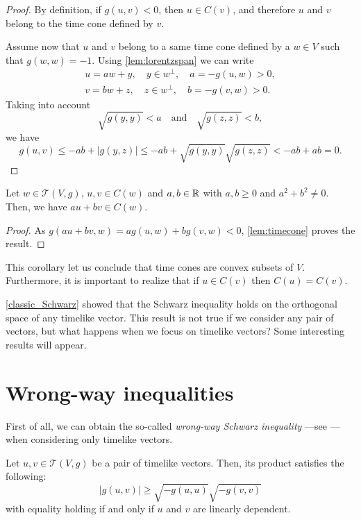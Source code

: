 \begin{proof}
    By definition, if $g(u,v)<0$, then $u\in C(v)$, and therefore $u$ and $v$ belong to the time cone defined by $v$.
    
    Assume now that $u$ and $v$ belong to a same time cone defined by a $w \in V$ such that $g(w,w) = -1$. Using \autoref{lem:lorentzspan} we can write
    \begin{align*}
        u=aw+y, \quad y\in w^{\perp}, \quad a=-g(u,w)>0,\\
        v=bw+z, \quad z\in w^{\perp}, \quad b=-g(v,w)>0.
    \end{align*}
    Taking into account
    \[
	    \sqrt{g(y,y)}<a \quad \mathrm{and} \quad \sqrt{g(z,z)}<b,
    \]
    we have
    \[
	    g(u,v)\leq -ab+ \lvert g(y,z) \rvert \leq -ab + \sqrt{g(y,y)}\sqrt{g(z,z)}<-ab+ab=0.
    \]
\end{proof}

\begin{corollary}\label{convexity}
Let $w\in\mathcal{T}(V,g)$, $u,v\in C(w)$ and $a,b\in \mathbb{R}$ with $a,b\geq 0$ and $a^2+b^2 \neq 0$. Then, we have $au+bv\in C(w)$.
\end{corollary}

\begin{proof}
    As $g(au+bv,w)=a g(u,w)+ b g(v,w)<0$, \autoref{lem:timecone} proves the result.
\end{proof}

This corollary let us conclude that time cones are convex subsets of $V$. Furthermore, it is important to realize that if $u\in C(v)$ then $C(u)=C(v)$.

\autoref{classic_Schwarz} showed that the Schwarz inequality holds on the orthogonal space of any timelike vector. This result is not true if we consider any pair of vectors, but what happens when we focus on timelike vectors? Some interesting results will appear.

\section{Wrong-way inequalities}

First of all, we can obtain the so-called \emph{wrong-way Schwarz inequality} ---see \cite[Prop. 5.30]{oneill83}--- when considering only timelike vectors.

\begin{proposition}
	\label{pro:wrongway}
    Let $u,v \in \mathcal{T}(V,g)$ be a pair of timelike vectors. Then, its product satisfies the following:
    \[
        \lvert g(u,v) \vert \geq \sqrt{-g(u,u)}\sqrt{-g(v,v)}
    \]
    with equality holding if and only if $u$ and $v$ are linearly dependent.
\end{proposition}

